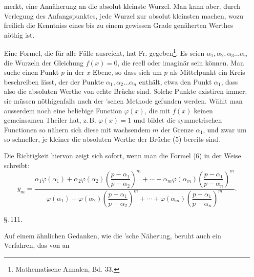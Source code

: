 merkt, eine Annäherung an die absolut kleinste Wurzel. Man kann aber, durch Verlegung des Anfangspunktes, jede Wurzel zur absolut kleinsten machen, wozu freilich die Kenntniss eines bis zu einem gewissen Grade genäherten Werthes nöthig ist.

Eine Formel, die für alle Fälle ausreicht, hat Fr.  gegeben\footnote{Mathematische Annalen, Bd. 33.}. Es seien $\alpha_1, \alpha_2, \alpha_3 \ldots \alpha_n$ die Wurzeln der Gleichung $f(x) = 0$, die reell oder imaginär sein können. Man suche einen Punkt $p$ in der $x$-Ebene, so dass sich um $p$ als Mittelpunkt ein Kreis beschreiben lässt, der  der Punkte $\alpha_1, \alpha_2 \ldots \alpha_n$ enthält, etwa den Punkt $\alpha_1$, dass also die absoluten Werthe von
echte Brüche sind. Solche Punkte existiren immer; sie müssen nöthigenfalls nach der 'schen Methode gefunden werden. Wählt man ausserdem noch eine beliebige Function $\varphi(x)$, die mit $f(x)$ keinen gemeinsamen Theiler hat, z.\,B. $\varphi(x) = 1$ und bildet die symmetrischen Functionen
so nähern sich diese mit wachsendem $m$ der Grenze $\alpha_1$, und zwar um so schneller, je kleiner die absoluten Werthe der Brüche (5) bereits sind.

Die Richtigkeit hiervon zeigt sich sofort, wenn man die Formel (6) in der Weise schreibt:
\[
y_m = \frac{\alpha_1\varphi(\alpha_1) + \alpha_2\varphi(\alpha_2)\left(\dfrac{p-\alpha_1}{p-\alpha_2}\right)^m + \cdots + \alpha_m\varphi(\alpha_m)\left(\dfrac{p-\alpha_1}{p-\alpha_n}\right)^m}{\varphi(\alpha_1) + \varphi(\alpha_2)\left(\dfrac{p-\alpha_1}{p-\alpha_2}\right)^m + \cdots + \varphi(\alpha_m)\left(\dfrac{p-\alpha_1}{p-\alpha_n}\right)^m}.
\]

\begin{center}
\S.\,111.

\end{center}

Auf einem ähnlichen Gedanken, wie die 'sche Näherung, beruht auch ein Verfahren, das von  an-
